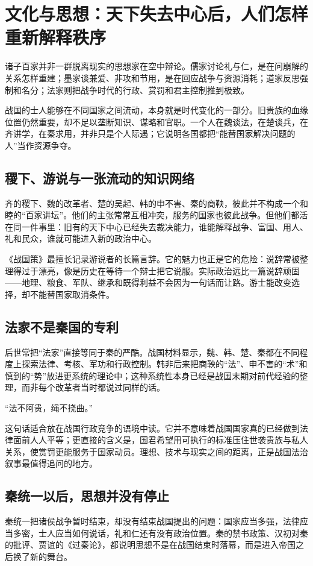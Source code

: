 \section{文化与思想：天下失去中心后，人们怎样重新解释秩序}

诸子百家并非一群脱离现实的思想家在空中辩论。儒家讨论礼与仁，是在问崩解的关系怎样重建；墨家谈兼爱、非攻和节用，是在回应战争与资源消耗；道家反思强制和名分；法家则把战争时代的行政、赏罚和君主控制推到极致。

战国的士人能够在不同国家之间流动，本身就是时代变化的一部分。旧贵族的血缘位置仍然重要，却不足以垄断知识、谋略和官职。一个人在魏谈法，在楚谈兵，在齐讲学，在秦求用，并非只是个人际遇；它说明各国都把“能替国家解决问题的人”当作资源争夺。

\subsection{稷下、游说与一张流动的知识网络}

齐的稷下、魏的改革者、楚的吴起、韩的申不害、秦的商鞅，彼此并不构成一个和睦的“百家讲坛”。他们的主张常常互相冲突，服务的国家也彼此战争。但他们都活在同一件事里：旧有的天下中心已经失去裁决能力，谁能解释战争、富国、用人、礼和民众，谁就可能进入新的政治中心。

《战国策》最擅长记录游说者的长篇言辞。它的魅力也正是它的危险：说辞常被整理得过于漂亮，像是历史在等待一个辩士把它说服。实际政治远比一篇说辞顽固——地理、粮食、军队、继承和既得利益不会因为一句话而让路。游士能改变选择，却不能替国家取消条件。

\subsection{法家不是秦国的专利}

后世常把“法家”直接等同于秦的严酷。战国材料显示，魏、韩、楚、秦都在不同程度上探索法律、考核、军功和行政控制。韩非后来把商鞅的“法”、申不害的“术”和慎到的“势”放进更系统的理论中；这种系统性本身已经是战国末期对前代经验的整理，而非每个改革者当时都说过同样的话。

\begin{textwindow}[韩非的冷句]
“法不阿贵，绳不挠曲。”

这句话适合放在战国行政竞争的语境中读。它并不意味着战国国家真的已经做到法律面前人人平等；更直接的含义是，国君希望用可执行的标准压住世袭贵族与私人关系，使赏罚更能服务于国家动员。理想、技术与现实之间的距离，正是战国法治叙事最值得追问的地方。
\end{textwindow}

\subsection{秦统一以后，思想并没有停止}

秦统一把诸侯战争暂时结束，却没有结束战国提出的问题：国家应当多强，法律应当多密，士人应当如何说话，礼和仁还有没有政治位置。秦的禁书政策、汉初对秦的批评、贾谊的《过秦论》，都说明思想不是在战国结束时落幕，而是进入帝国之后换了新的舞台。

